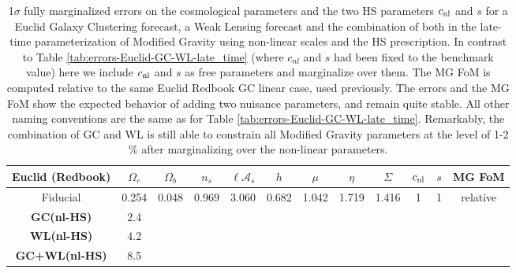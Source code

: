 \begin{table}[htbp]
\centering{}%
\tiny
\begin{tabular}{|c|c|c|c|c|c||c|c|c||c|c|c|}
\hline 
\textbf{Euclid} (Redbook)  & $\Omega_{c}$  & $\Omega_{b}$  & $n_{s}$  &
$\ell\mathcal{A}_{s}$  & $h$  & $\mu$  & $\eta$  & $\Sigma$ \Tstrut &
$c_{\mathrm{nl}}$  & $s$ & MG FoM \tabularnewline
\hline 
\Tstrut Fiducial  & {0.254}  & {0.048}  & {0.969}  & {3.060}  & {0.682}  & {1.042}  & {1.719}  & {1.416}  & {1}  & {1} & relative \tabularnewline
\hline
\hline
\Tstrut \textbf{GC(nl-HS)}   
& 2.4 \tabularnewline 
\Tstrut \textbf{WL(nl-HS)}    
& 4.2 \tabularnewline 
\Tstrut \textbf{GC+WL(nl-HS)}   
& 8.5 \tabularnewline
\hline 
\end{tabular}
\small
\protect\caption[1$\sigma$ forecasted errors on the cosmological parameters for a Euclid GC and WL survey, marginalizing over
the HS non-linear prescription parameters.]{\label{tab:errors-GC+WL-Marginalize-HS-Zhao-Euclid-DEpar-muetasigma}
1$\sigma$ fully marginalized errors on the cosmological parameters
and the two HS parameters $c_{\mathrm{nl}}$ and $s$ for a Euclid Galaxy
Clustering forecast, a Weak Lensing forecast and the combination of
both in the late-time parameterization of Modified Gravity using non-linear
scales and the HS prescription. In contrast to Table
\ref{tab:errors-Euclid-GC-WL-late_time} (where $c_{nl}$ and $s$ had been fixed to the benchmark value)
here we include $c_{\mathrm{nl}}$ and $s$ as free parameters
and marginalize over them. The MG FoM is computed relative to the same Euclid Redbook GC 
linear case,
used previously. The errors and the MG FoM show the expected behavior
of adding two nuisance parameters, and remain quite stable. All other naming conventions are the
same as for Table \ref{tab:errors-Euclid-GC-WL-late_time}. Remarkably, the combination of GC and WL is still able to constrain all Modified Gravity parameters at the level of 1-2 $\%$ after marginalizing over the non-linear parameters.}
\end{table}
\normalsize



